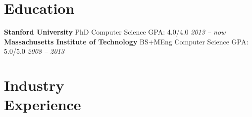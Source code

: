 \documentclass[margin,line]{resume}
\begin{document}
\begin{resume}

\section{\mysidestyle Education}

\textbf{Stanford University} \hspace{30.0mm} PhD \hspace{11.2mm} Computer Science \hspace{2.5mm} GPA: 4.0/4.0 \hfill \textsl{2013 -- now}\\
\textbf{Massachusetts Institute of Technology} \hspace{2.5mm} BS+MEng \hspace{2.5mm} Computer Science \hspace{2.5mm} GPA: 5.0/5.0 \hfill \textsl{2008 -- 2013}



\section{\mysidestyle Industry\\Experience}


\end{resume}
\end{document}
